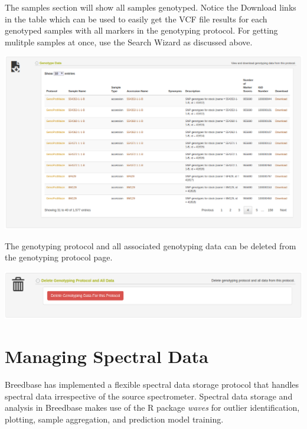 \documentclass[
  12pt,
]{book}
\begin{document}
The samples section will show all samples genotyped. Notice the Download links in the table which can be used to easily get the VCF file results for each genotyped samples with all markers in the genotyping protocol. For getting mulitple samples at once, use the Search Wizard as discussed above.

\begin{center}\includegraphics[width=0.95\linewidth]{assets/images/genotyping_protocol_detail_page_samples} \end{center}

The genotyping protocol and all associated genotyping data can be deleted from the genotyping protocol page.

\begin{center}\includegraphics[width=0.95\linewidth]{assets/images/genotyping_protocol_detail_page_delete} \end{center}

\hypertarget{managing-spectral-data}{%
\chapter{Managing Spectral Data}\label{managing-spectral-data}}

Breedbase has implemented a flexible spectral data storage protocol that handles spectral data irrespective of the source spectrometer. Spectral data storage and analysis in Breedbase makes use of the R package \emph{waves} for outlier identification, plotting, sample aggregation, and prediction model training.
\end{document}
